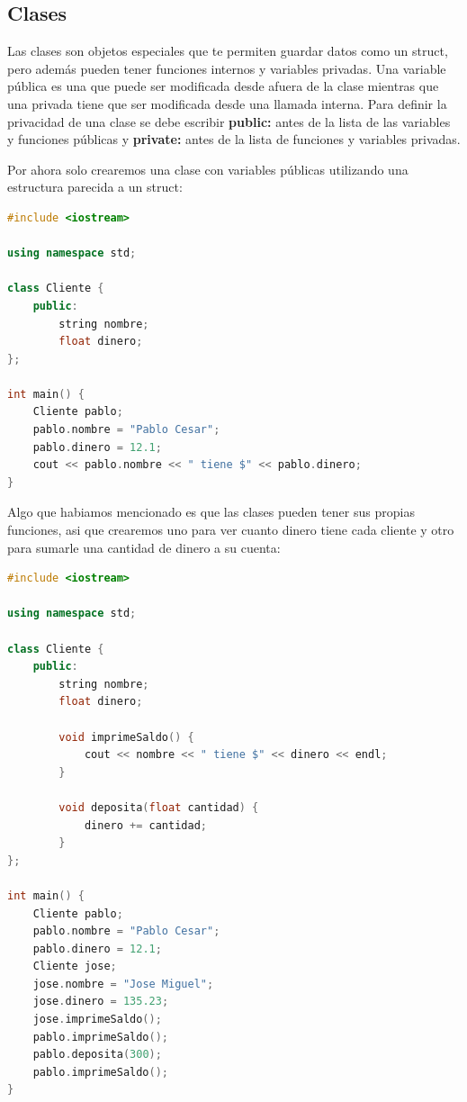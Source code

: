 \documentclass{article}
\begin{document}
\subsection{Clases}

Las clases son objetos especiales que te permiten guardar datos como un struct, pero además pueden tener funciones internos y variables privadas. Una variable pública es una que puede ser modificada desde afuera de la clase mientras que una privada tiene que ser modificada desde una llamada interna. Para definir la privacidad de una clase se debe escribir \textbf{public:} antes de la lista de las variables y funciones públicas y \textbf{private:} antes de la lista de funciones y variables privadas.

Por ahora solo crearemos una clase con variables públicas utilizando una estructura parecida a un struct:

\begin{lstlisting}[language=C++, caption=Declarando clases]
#include <iostream>

using namespace std;

class Cliente {
    public:
        string nombre;
        float dinero;
};

int main() {
    Cliente pablo;
    pablo.nombre = "Pablo Cesar";
    pablo.dinero = 12.1;
    cout << pablo.nombre << " tiene $" << pablo.dinero;
}
\end{lstlisting}

Algo que habiamos mencionado es que las clases pueden tener sus propias funciones, asi que crearemos uno para ver cuanto dinero tiene cada cliente y otro para sumarle una cantidad de dinero a su cuenta:

\begin{lstlisting}[language=C++, caption=Funciones internas]
#include <iostream>

using namespace std;

class Cliente {
    public:
        string nombre;
        float dinero;

        void imprimeSaldo() {
            cout << nombre << " tiene $" << dinero << endl;
        }

        void deposita(float cantidad) {
            dinero += cantidad;
        }
};

int main() {
    Cliente pablo;
    pablo.nombre = "Pablo Cesar";
    pablo.dinero = 12.1;
    Cliente jose;
    jose.nombre = "Jose Miguel";
    jose.dinero = 135.23;
    jose.imprimeSaldo();
    pablo.imprimeSaldo();
    pablo.deposita(300);
    pablo.imprimeSaldo();
}
\end{lstlisting}
\end{document}

